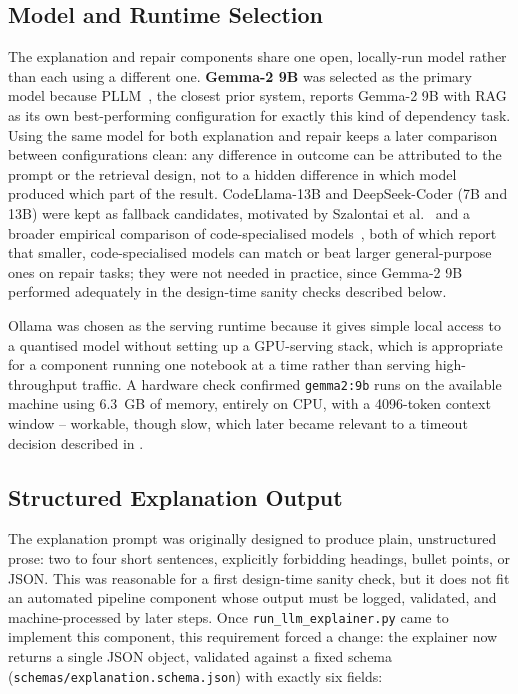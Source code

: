 \subsection{Model and Runtime Selection}

The explanation and repair components share one open, locally-run model
rather than each using a different one. \textbf{Gemma-2 9B} was selected as
the primary model because PLLM~\cite{bartlett2025pllm}, the closest prior
system, reports Gemma-2 9B with RAG as its own best-performing configuration
for exactly this kind of dependency task. Using the same model for both
explanation and repair keeps a later comparison between configurations
clean: any difference in outcome can be attributed to the prompt or the
retrieval design, not to a hidden difference in which model produced which
part of the result. CodeLlama-13B and DeepSeek-Coder (7B and 13B) were kept
as fallback candidates, motivated by Szalontai et
al.~\cite{szalontai2024codellama} and a broader empirical comparison of
code-specialised models~\cite{empiricalapr2025}, both of which report that
smaller, code-specialised models can match or beat larger general-purpose
ones on repair tasks; they were not needed in practice, since Gemma-2 9B
performed adequately in the design-time sanity checks described below.

Ollama was chosen as the serving runtime because it gives simple local
access to a quantised model without setting up a GPU-serving stack, which
is appropriate for a component running one notebook at a time rather than
serving high-throughput traffic. A hardware check confirmed \texttt{gemma2:9b}
runs on the available machine using 6.3~GB of memory, entirely on CPU, with
a 4096-token context window -- workable, though slow, which later became
relevant to a timeout decision described in .

\subsection{Structured Explanation Output}
\label{sec:m-explanation-deviation}

The explanation prompt was originally designed to produce plain,
unstructured prose: two to four short sentences, explicitly forbidding
headings, bullet points, or JSON. This was reasonable for a first
design-time sanity check, but it does not fit an automated pipeline
component whose output must be logged, validated, and machine-processed by
later steps. Once \texttt{run\_llm\_explainer.py} came to implement this
component, this requirement forced a change: the explainer now returns a
single JSON object, validated against a fixed schema
(\texttt{schemas/}\allowbreak\texttt{explanation.schema.json}) with exactly
six fields:

